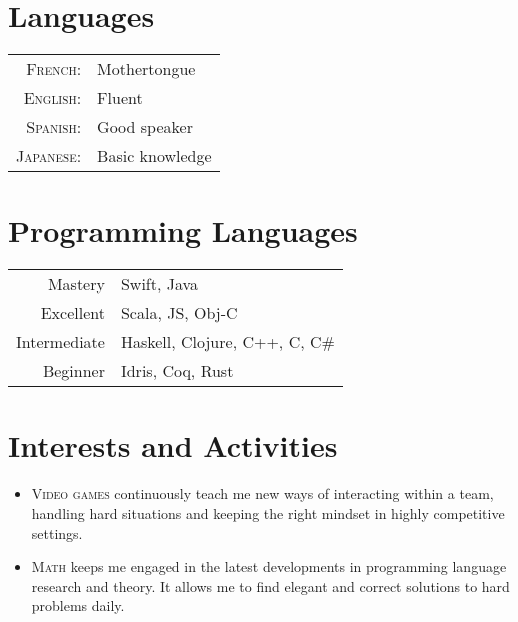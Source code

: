 \documentclass[a4paper,10pt]{article} %
\begin{document}
\section{Languages}

\begin{tabular}{rl}
\textsc{French:} & Mothertongue\\

\textsc{English:} & Fluent\\

\textsc{Spanish:} & Good speaker\\

\textsc{Japanese:} & Basic knowledge\\

\end{tabular}


\section{Programming Languages}

\begin{tabular}{r|l}
Mastery & Swift, Java\\
Excellent & Scala, JS, Obj-C\\
Intermediate & Haskell, Clojure, C++, C, C\#\\
Beginner & Idris, Coq, Rust\\
\end{tabular}

\section{Interests and Activities}
\begin{itemize}
	\item \textsc{Video games} continuously teach me new ways of interacting within a team, handling hard situations and keeping the right mindset in highly competitive settings.
	\item \textsc{Math} keeps me engaged in the latest developments in programming language research and theory. It allows me to find elegant and correct solutions to hard problems daily.
\end{itemize}
\end{document}
